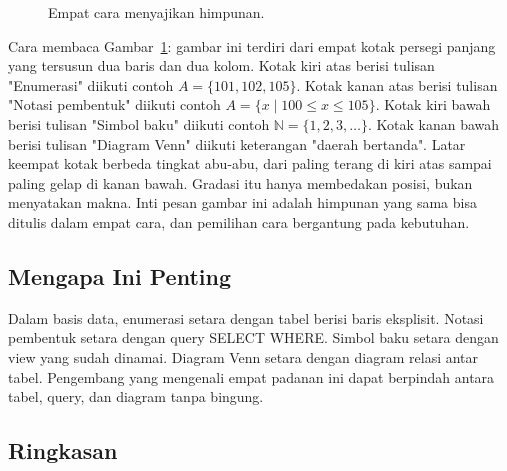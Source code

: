 \documentclass[11pt,a4paper]{article}
\begin{document}
\begin{figure}[H]
	\centering
	\caption{Empat cara menyajikan himpunan.}
	\label{fig:empat-penyajian}
\end{figure}

Cara membaca Gambar~\ref{fig:empat-penyajian}: gambar ini terdiri dari empat kotak persegi panjang yang tersusun dua baris dan dua kolom. Kotak kiri atas berisi tulisan "Enumerasi" diikuti contoh $A=\{101,102,105\}$. Kotak kanan atas berisi tulisan "Notasi pembentuk" diikuti contoh $A=\{x \mid 100 \le x \le 105\}$. Kotak kiri bawah berisi tulisan "Simbol baku" diikuti contoh $\mathbb{N}=\{1,2,3,\ldots\}$. Kotak kanan bawah berisi tulisan "Diagram Venn" diikuti keterangan "daerah bertanda". Latar keempat kotak berbeda tingkat abu-abu, dari paling terang di kiri atas sampai paling gelap di kanan bawah. Gradasi itu hanya membedakan posisi, bukan menyatakan makna. Inti pesan gambar ini adalah himpunan yang sama bisa ditulis dalam empat cara, dan pemilihan cara bergantung pada kebutuhan.

\subsection{Mengapa Ini Penting}

Dalam basis data, enumerasi setara dengan tabel berisi baris eksplisit. Notasi pembentuk setara dengan query SELECT WHERE. Simbol baku setara dengan view yang sudah dinamai. Diagram Venn setara dengan diagram relasi antar tabel. Pengembang yang mengenali empat padanan ini dapat berpindah antara tabel, query, dan diagram tanpa bingung.

\subsection{Ringkasan}
\end{document}
